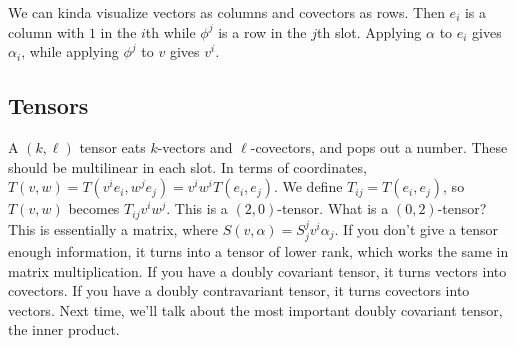 We can kinda visualize vectors as columns and covectors as rows. Then $e_i $ is a column with $1$ in the $i$th while $\phi^j$ is a row in the $j$th slot. Applying $\alpha $ to $e_i $ gives $\alpha _i $, while applying $\phi^j$ to $v$ gives $v^i $.
\subsection{Tensors}
A $(k,\ell)$ tensor eats $k$-vectors and $\ell$-covectors, and pops out a number. These should be multilinear in each slot. In terms of coordinates, $T(v,w)=T(v^i e_i ,w^je_j )=v^i w^i T(e_i ,e_j )$. We define $T_{ij}=T(e_i ,e_j )$, so $T(v,w)$ becomes $T_{ij}v^i w^j$. This is a $(2,0)$-tensor. What is a $(0,2)$-tensor? This is essentially a matrix, where $S(v,\alpha )=S_j ^j v^i \alpha _j $. If you don't give a tensor enough information, it turns into a tensor of lower rank, which works the same in matrix multiplication. If you have a doubly covariant tensor, it turns vectors into covectors. If you have a doubly contravariant tensor, it turns covectors into vectors. Next time, we'll talk about the most important doubly covariant tensor, the inner product.
